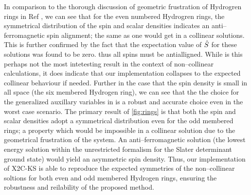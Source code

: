 In comparison to the thorough discussion of geometric frustration of Hydrogren rings in Ref \cite{Li15_154109}, 
we can see that for the even numbered Hydrogren rings,
the symmetrical distribution of the spin and scalar densities indicates an anti--ferromagnetic spin
alignment; the same as one would get in a collinear solutions. This is further confirmed by the fact that
the expectation value of $\hat{S}$ for these solutions was found to be zero. thus all spins must be antialligned.
While is this perhaps not the most
intetesting result in the context of non--collinear calculations, it does indicate that our implementation
collapses to the expected collinear behaviour if needed. Further in the case that the spin density is small
in all space (the six membered Hydrogen ring), we can see that the the choice for the generalized auxillary
variables in  is a robust and accurate choice even in the worst case scenario.
The primary result of \cref{fig:rings} is that both the spin and scalar densities adopt a symmetrical
distribution even for the odd membered rings; a property which would be impossible in a collinear solution
due to the geometrical frustration of the system. An anti--ferromagnetic solution (the lowest energy
solution within the unrestricted formalism for the Slater determinant ground state) would yield an
asymmetric spin density. Thus, our implementation of X2C-KS is able to reproduce the expected symmetries of
the non--collinear soltions for both even and odd membered Hydrogen rings, ensuring the robustness and 
reilability of the proposed method.




